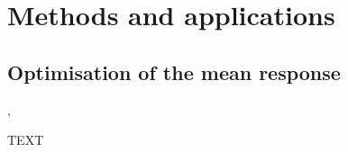 \documentclass[npg]{copernicus}
\begin{document}
\section{Methods and applications}
\subsection{Optimisation of the mean response}
\cite{janusevskis_simultaneous_2010}, \cite{miranda_adjoint-based_2016}


\conclusions  %
TEXT











\appendix
\section{}    %

\subsection{}     %


\noappendix       %



\end{document}
